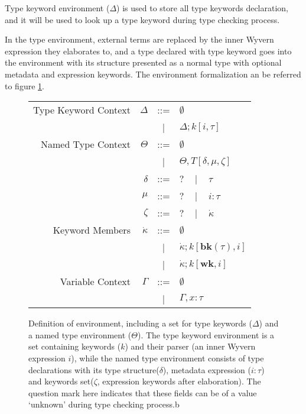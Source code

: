 \documentclass{sig-alternate}
\begin{document}
Type keyword environment ($\Delta$) is used to store all type keywords declaration, and it will be used to look up a type keyword during type checking process.

In the type environment, external terms are replaced by the inner Wyvern expression they elaborates to, and a type declared with type keyword goes into the environment with its structure presented as a normal type with optional metadata and expression keywords. The environment formalization an be referred to figure \ref{typechecking-environment}.

\begin{figure}[ht]
\begin{center}
\begin{tabular}{r r c l}
Type Keyword Context & $\Delta$ & ::= & $\emptyset$\\
            &                 &  |   & $\Delta;k[i,\tau]$\\
Named Type Context & $\Theta$        & ::= & $\emptyset$\\
            &                 &  |   & $\Theta,T[\delta,\mu,\zeta]$\\
       & $\delta$        & ::= & $?$ ~ | ~ $\tau$\\
   & $\mu$           & ::= & $?$ ~ | ~ $i:\tau$\\
   & $\zeta$         & ::= & $?$ ~ | ~ $\dot\kappa$\\
Keyword Members & $\dot\kappa$    & ::= & $\emptyset$\\
            &                 &   |  & $\dot\kappa;k[\mathbf{bk}(\tau),i]$\\
            &                 &   |  & $\dot\kappa;k[\mathbf{wk},i]$\\
Variable Context & $\Gamma$ &   ::=  & $\emptyset$\\
                 &          &     |  & $\Gamma,x:\tau$
\end{tabular}
\end{center}
\vspace{-8px}
\caption{Definition of environment, including a set for type keywords ($\Delta$) and a named type environment ($\Theta$). The type keyword environment is a set containing keywords ($k$) and their parser (an inner Wyvern expression $i$), while the named type environment consists of type declarations with its type structure($\delta$), metadata expression ($i:\tau$) and keywords set($\zeta$, expression keywords after elaboration). The question mark here indicates that these fields can be of a value `unknown' during type checking process.b}
\vspace{-10px}
\label{typechecking-environment}

\end{figure}
\end{document}
